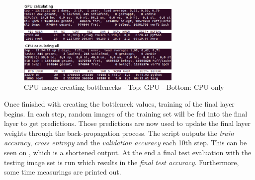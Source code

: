 \begin{figure}[htbp]
\centering
\includegraphics[width=0.7\textwidth]{includes/bottlenecksCPUUsage}
\caption[CPU usage creating bottlenecks]{CPU usage creating bottlenecks - Top: GPU - Bottom: CPU only}
\label{fig:bottlenecksCPUUsage}
\end{figure}

Once finished with creating the bottleneck values, training of the final layer begins. In each step, random images of the training set will be fed into the final layer to get predictions. Those predictions are now used to update the final layer weights through the back-propagation process. The script outputs the \textit{train accuracy}, \textit{cross entropy} and the \textit{validation accuracy} each 10th step. This can be seen on , which is a shortened output. At the end a final test evaluation with the testing image set is run which results in the \textit{final test accuracy}. Furthermore, some time measurings are printed out. \citep{TensorFlowRetrain2017} 

